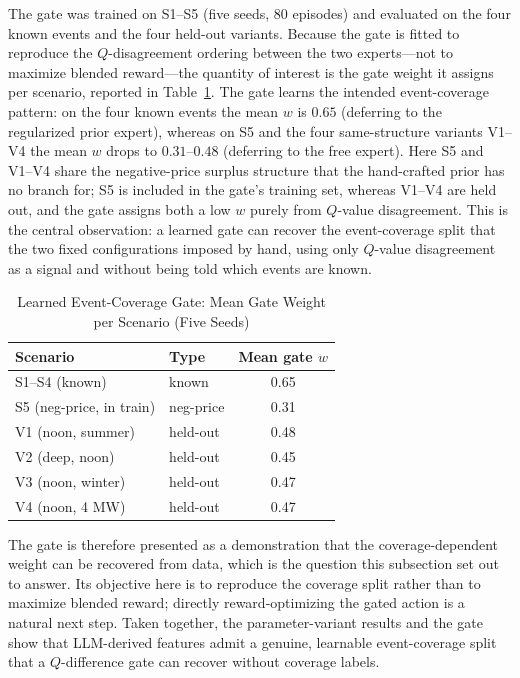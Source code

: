 \documentclass{ieeeaccess}
\begin{document}
The gate was trained on S1--S5 (five seeds, 80 episodes) and evaluated on the four known events and the four held-out variants. Because the gate is fitted to reproduce the $Q$-disagreement ordering between the two experts---not to maximize blended reward---the quantity of interest is the gate weight it assigns per scenario, reported in Table~\ref{tab:gated_moe}. The gate learns the intended event-coverage pattern: on the four known events the mean $w$ is $0.65$ (deferring to the regularized prior expert), whereas on S5 and the four same-structure variants V1--V4 the mean $w$ drops to $0.31$--$0.48$ (deferring to the free expert). Here S5 and V1--V4 share the negative-price surplus structure that the hand-crafted prior has no branch for; S5 is included in the gate's training set, whereas V1--V4 are held out, and the gate assigns both a low $w$ purely from $Q$-value disagreement. This is the central observation: a learned gate can recover the event-coverage split that the two fixed configurations imposed by hand, using only $Q$-value disagreement as a signal and without being told which events are known.

\begin{table}[t!]
\caption{Learned Event-Coverage Gate: Mean Gate Weight per Scenario (Five Seeds)}
\label{tab:gated_moe}
\centering
\begin{tabular}{llc}
\toprule
\textbf{Scenario} & \textbf{Type} & \textbf{Mean gate $w$} \\
\midrule
S1--S4 (known) & known & 0.65 \\
S5 (neg-price, in train) & neg-price & 0.31 \\
V1 (noon, summer) & held-out & 0.48 \\
V2 (deep, noon) & held-out & 0.45 \\
V3 (noon, winter) & held-out & 0.47 \\
V4 (noon, 4 MW) & held-out & 0.47 \\
\bottomrule
\end{tabular}
\end{table}

The gate is therefore presented as a demonstration that the coverage-dependent weight can be recovered from data, which is the question this subsection set out to answer. Its objective here is to reproduce the coverage split rather than to maximize blended reward; directly reward-optimizing the gated action is a natural next step. Taken together, the parameter-variant results and the gate show that LLM-derived features admit a genuine, learnable event-coverage split that a $Q$-difference gate can recover without coverage labels.
\end{document}
